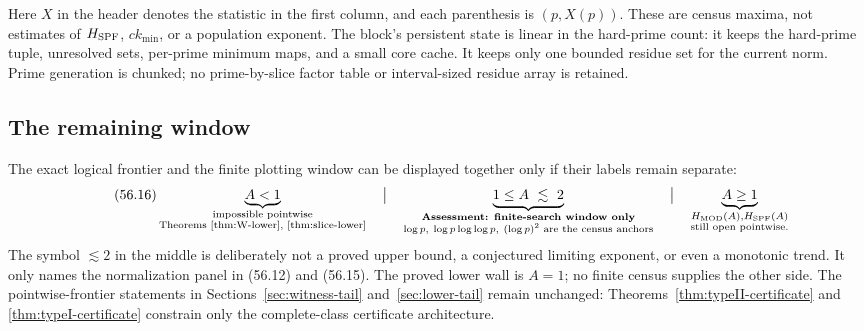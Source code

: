 \documentclass[10pt,reqno]{amsart}
\theoremstyle{definition}
\newcommand{\1}{\mathbf 1}
\begin{document}
\endgroup
Here $X$ in the header denotes the statistic in the first column, and each
parenthesis is $(p,X(p))$.  These are census maxima, not estimates of
$H_{\rm SPF}$, $ck_{\min}$, or a population exponent.
The block's persistent state is linear in the hard-prime count: it keeps the
hard-prime tuple, unresolved sets, per-prime minimum maps, and a small core
cache.  It keeps only one bounded residue set for the current norm.  Prime
generation is chunked; no prime-by-slice factor table or interval-sized
residue array is retained.

\subsection{The remaining window}
The exact logical frontier and the finite plotting window can be displayed
together only if their labels remain separate:
\begingroup
\small
\begin{equation}\label{eq:remaining-window}\tag{56.16}
 \underbrace{A<1}_{\substack{\text{impossible pointwise}\\
                    \text{Theorems~\ref{thm:W-lower},
                    \ref{thm:slice-lower}}}}
 \quad\big|\quad
 \underbrace{1\leq A\ \lesssim\ 2}_{\substack{
        \text{\bfseries Assessment: finite-search window only}\\
        \log p,\ \log p\log\log p,\ (\log p)^2
        \text{ are the census anchors}}}
 \quad\big|\quad
 \underbrace{A\geq1}_{\substack{H_{\rm MOD}(A),H_{\rm SPF}(A)\\
                                  \text{still open pointwise}.}}
\end{equation}
\endgroup
The symbol $\lesssim2$ in the middle is deliberately not a proved upper
bound, a conjectured limiting exponent, or even a monotonic trend.  It only
names the normalization panel in (56.12) and (56.15).  The proved lower wall
is $A=1$; no finite census supplies the other side.  The pointwise-frontier
statements in Sections~\ref{sec:witness-tail} and~\ref{sec:lower-tail}
remain unchanged: Theorems~\ref{thm:typeII-certificate} and
\ref{thm:typeI-certificate} constrain only the complete-class certificate
architecture.
\end{document}
